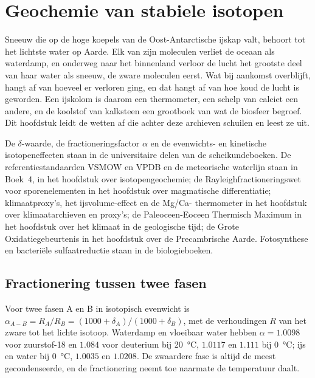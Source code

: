 \chapter{Geochemie van stabiele isotopen}\label{ch:b3:stable-isotopes}

Sneeuw die op de hoge koepels van de Oost-Antarctische ijskap valt, behoort
tot het lichtste water op Aarde. Elk van zijn moleculen verliet de oceaan als waterdamp, en
onderweg naar het binnenland verloor de lucht het grootste deel van haar water als sneeuw, de zware moleculen
eerst. Wat bij aankomst overblijft, hangt af van hoeveel er verloren ging, en dat hangt af van
hoe koud de lucht is geworden. Een ijskolom is daarom een thermometer, een schelp
van calciet een andere, en de koolstof van kalksteen een grootboek van wat de
biosfeer begroef. Dit hoofdstuk leidt de wetten af die achter deze archieven schuilen en
leest ze uit.

\begin{recall}
De $\delta$-waarde, de fractioneringsfactor $\alpha$ en de evenwichts- en
kinetische isotopeneffecten staan in de universitaire delen van de scheikundeboeken. De
referentiestandaarden VSMOW en VPDB en de meteorische waterlijn staan in
Boek~4, in het hoofdstuk over isotopengeochemie; de Rayleighfractioneringswet
voor sporenelementen in het hoofdstuk over magmatische
differentiatie; klimaatproxy's, het ijsvolume-effect en de Mg/Ca-
thermometer in het hoofdstuk over klimaatarchieven en proxy's; de
Paleoceen-Eoceen Thermisch Maximum in het hoofdstuk over het klimaat in de geologische
tijd; de Grote Oxidatiegebeurtenis in het hoofdstuk over de Precambrische Aarde.
Fotosynthese en bacteriële sulfaatreductie staan in de biologieboeken.
\end{recall}

\section{Fractionering tussen twee fasen}\label{sec:b3:stable-isotopes:fractionation}

Voor twee fasen A en B in isotopisch evenwicht is $\alpha_{A-B} = R_A/R_B =
(1000 + \delta_A)/(1000 + \delta_B)$, met de verhoudingen $R$ van het zware tot het
lichte isotoop. Waterdamp en vloeibaar water hebben $\alpha = 1.0098$ voor zuurstof-18
en $1.084$ voor deuterium bij \qty{20}{\celsius}, $1.0117$ en $1.111$ bij
\qty{0}{\celsius}; ijs en water bij \qty{0}{\celsius}, $1.0035$ en $1.0208$.
De zwaardere fase is altijd de meest gecondenseerde, en de fractionering
neemt toe naarmate de temperatuur daalt.

